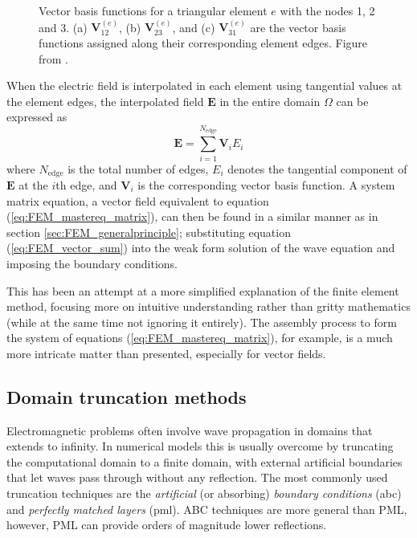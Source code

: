 \begin{figure}[htb]
\begin{subfigure}{0.32\textwidth}
        \caption{}
    \end{subfigure}
    \caption{Vector basis functions for a triangular element $e$ with the nodes 1, 2 and 3. (a) $\mathbf{V}_{12}^{(e)}$, (b) $\mathbf{V}_{23}^{(e)}$, and (c) $\mathbf{V}_{31}^{(e)}$ are the vector basis functions assigned along their corresponding element edges. Figure from \cite{FEM_in_EM_jianming_jin}.}
    \label{fig:FEM_vector_element}
\end{figure}

When the electric field is interpolated in each element using tangential values at the element edges, the interpolated field $\mathbf{E}$ in the entire domain $\Omega$ can be expressed as 
\begin{equation}
    \mathbf{E} = \sum_{i=1}^{N_{\text{edge}}} \mathbf{V}_i E_i
    \label{eq:FEM_vector_sum}
\end{equation}
where $N_{\text{edge}}$ is the total number of edges, $E_i$ denotes the tangential component of $\mathbf{E}$ at the $i$th edge, and $\mathbf{V}_i$ is the corresponding vector basis function. A system matrix equation, a vector field equivalent to equation (\ref{eq:FEM_mastereq_matrix}), can then be found in a similar manner as in section \ref{sec:FEM_generalprinciple}; substituting equation (\ref{eq:FEM_vector_sum}) into the weak form solution of the wave equation and imposing the boundary conditions\cite{FEM_TheoryAndCompOfEM_Jian-Ming_Jin}.

This has been an attempt at a more simplified explanation of the finite element method, focusing more on intuitive understanding rather than gritty mathematics (while at the same time not ignoring it entirely). The assembly process to form the system of equations (\ref{eq:FEM_mastereq_matrix}), for example, is a much more intricate matter than presented, especially for vector fields.


\subsection{Domain truncation methods}
Electromagnetic problems often involve wave propagation in domains that extends to infinity. In numerical models this is usually overcome by truncating the computational domain to a finite domain, with external artificial boundaries that let waves pass through without any reflection. The most commonly used truncation techniques are the \emph{artificial} (or absorbing) \emph{boundary conditions} (\ac{abc}) and \emph{perfectly matched layers} (\ac{pml}). ABC techniques are more general than PML, however, PML can provide orders of magnitude lower reflections\cite{ABCandPML_Nataf}.

